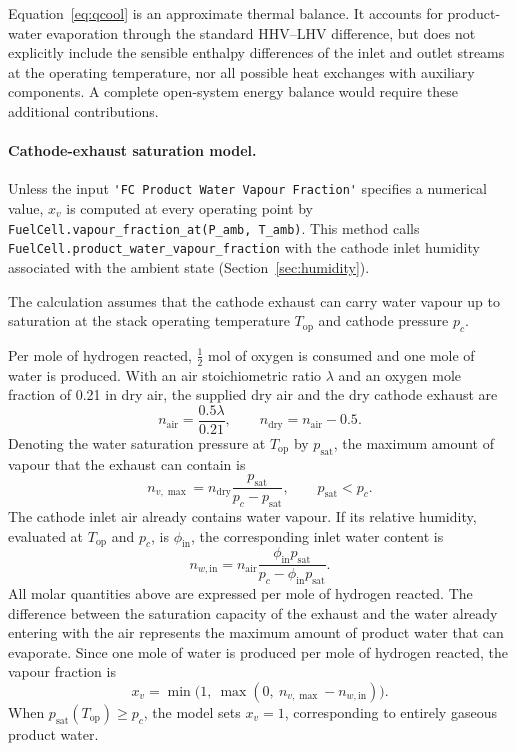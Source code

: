 \documentclass[a4paper,11pt]{article}
\newcommand{\code}[1]{\nolinkurl{#1}}
\newcommand{\fn}[1]{\nolinkurl{#1}}
\begin{document}
Equation~\eqref{eq:qcool} is an approximate thermal balance.
It accounts for product-water evaporation through the standard
HHV--LHV difference, but does not explicitly include the sensible
enthalpy differences of the inlet and outlet streams at the
operating temperature, nor all possible heat exchanges with
auxiliary components. A complete open-system energy balance
would require these additional contributions.

\paragraph{Cathode-exhaust saturation model.}
Unless the input \code{'FC Product Water Vapour Fraction'} specifies
a numerical value, $x_v$ is computed at every operating point by
\fn{FuelCell.vapour_fraction_at(P_amb, T_amb)}. This method calls
\fn{FuelCell.product_water_vapour_fraction} with the cathode
inlet humidity associated with the ambient state
(Section~\ref{sec:humidity}).

The calculation assumes that the cathode exhaust can carry water
vapour up to saturation at the stack operating temperature
$T_\mathrm{op}$ and cathode pressure $p_c$.

Per mole of hydrogen reacted, $\tfrac12$ mol of oxygen is consumed
and one mole of water is produced. With an air stoichiometric ratio
$\lambda$ and an oxygen mole fraction of 0.21 in dry air,
the supplied dry air and the dry cathode exhaust are
\begin{equation}
  n_\mathrm{air}=\frac{0.5\lambda}{0.21},
  \qquad
  n_\mathrm{dry}=n_\mathrm{air}-0.5.
\end{equation}
Denoting the water saturation pressure at $T_\mathrm{op}$ by
$p_\mathrm{sat}$, the maximum amount of vapour that the exhaust
can contain is
\begin{equation}
  n_{v,\max}
  =n_\mathrm{dry}\frac{p_\mathrm{sat}}{p_c-p_\mathrm{sat}},
  \qquad p_\mathrm{sat}<p_c.
\end{equation}
The cathode inlet air already contains water vapour. If its
relative humidity, evaluated at $T_\mathrm{op}$ and $p_c$, is
$\phi_\mathrm{in}$, the corresponding inlet water content is
\begin{equation}
  n_{w,\mathrm{in}}
  = n_\mathrm{air}
    \frac{\phi_\mathrm{in}p_\mathrm{sat}}
         {p_c-\phi_\mathrm{in}p_\mathrm{sat}}.
\end{equation}
All molar quantities above are expressed per mole of hydrogen
reacted. The difference between the saturation capacity of
the exhaust and the water already entering with the air
represents the maximum amount of product water that can
evaporate. Since one mole of water is produced per mole of
hydrogen reacted, the vapour fraction is
\begin{equation}
  x_v = \min\!\big(1,\ \max(0,\ n_{v,\max}-n_{w,\mathrm{in}})\big).
\end{equation}
When $p_\mathrm{sat}(T_\mathrm{op})\ge p_c$, the model sets
$x_v=1$, corresponding to entirely gaseous product water.
\end{document}

